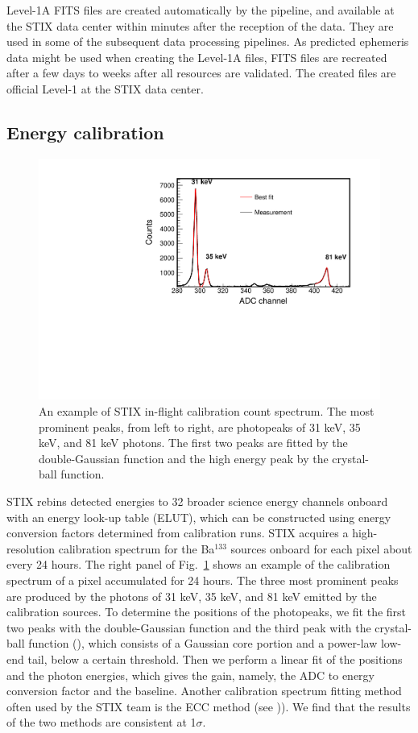 \documentclass[referee]{aa} %
\begin{document}
Level-1A FITS files are created automatically by the pipeline, and available at the STIX data center within minutes 
after the reception of the data. They are used in some of the subsequent data processing pipelines.
As predicted ephemeris data might be used when creating the Level-1A files,
FITS files are recreated after a few days to weeks after all resources are validated.
The created files are official Level-1  at the STIX data center. 
\subsection{Energy calibration}
\begin{figure}
 \centering
  \includegraphics[width=0.8\linewidth]{figures/cal-fit.pdf}
  \caption{An example of STIX in-flight calibration count spectrum.
  The most prominent peaks, from left to right, are photopeaks of 31 keV, 35 keV, and 81 keV
  photons. The first two peaks are fitted by the double-Gaussian function and the high energy peak by  
  the crystal-ball function. }
    \label{fig:cal-fit}
\end{figure}
STIX rebins detected energies to 32 broader science energy channels onboard
with an energy look-up table (ELUT), which can be constructed using energy conversion
factors determined from calibration runs. 
STIX acquires a high-resolution calibration spectrum
for the Ba$^{133}$ sources onboard for each pixel about every 24 hours. 
The right panel of Fig.~\ref{fig:cal-fit} shows an example of the calibration spectrum of a pixel accumulated for 24 hours.  
The three most prominent peaks are produced by the photons of  31 keV, 35 keV, and 81 keV emitted by the calibration sources. 
To determine the positions of the photopeaks, we fit the first two peaks with the double-Gaussian function and the third peak
with the crystal-ball function (\cite{crsystallball}),  which consists of a Gaussian core portion 
and a power-law low-end tail, below a certain threshold.
Then we perform a linear fit of the positions and the photon energies, 
which gives the gain, namely, the ADC to energy conversion factor and the baseline. 
Another calibration spectrum fitting method often used by the STIX team  
 is the ECC method (see \cite{ecc,ecc2})).  We find that the results of the two methods are consistent at 1$\sigma$.
\end{document}
